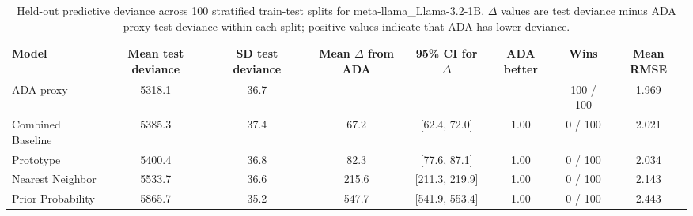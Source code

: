 \begin{table}

\caption{\label{tab:repeated-split-deviance-meta-llama-llama-3-2-1b}Held-out predictive deviance across 100 stratified train-test splits for meta-llama_Llama-3.2-1B. $\Delta$ values are test deviance minus ADA proxy test deviance within each split; positive values indicate that ADA has lower deviance.}
\centering
\begin{tabular}[t]{lccccccc}
\toprule
Model & Mean test deviance & SD test deviance & Mean $\Delta$ from ADA & 95\% CI for $\Delta$ & ADA better & Wins & Mean RMSE\\
\midrule
ADA proxy & 5318.1 & 36.7 & -- & -- & -- & 100 / 100 & 1.969\\
Combined Baseline & 5385.3 & 37.4 & 67.2 & {}[62.4, 72.0] & 1.00 & 0 / 100 & 2.021\\
Prototype & 5400.4 & 36.8 & 82.3 & {}[77.6, 87.1] & 1.00 & 0 / 100 & 2.034\\
Nearest Neighbor & 5533.7 & 36.6 & 215.6 & {}[211.3, 219.9] & 1.00 & 0 / 100 & 2.143\\
Prior Probability & 5865.7 & 35.2 & 547.7 & {}[541.9, 553.4] & 1.00 & 0 / 100 & 2.443\\
\bottomrule
\end{tabular}
\end{table}
